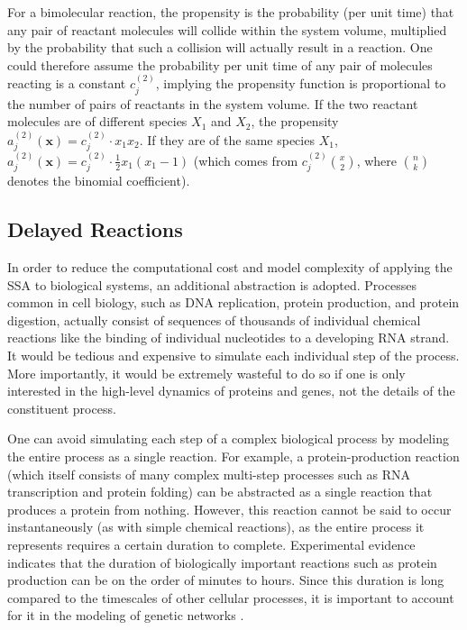 \documentclass[english,letterpaper,12pt]{report}
\renewcommand{\vec}[1]{\ensuremath{\mathbf{#1}}}
\begin{document}
\begin{doublespacing}
For a bimolecular reaction, the propensity is the probability (per unit time) that any pair of reactant molecules will collide within the system volume, multiplied by the probability that such a collision will actually result in a reaction. One could therefore assume the probability per unit time of any pair of molecules reacting is a constant $c_j^{(2)}$, implying the propensity function is proportional to the number of pairs of reactants in the system volume. If the two reactant molecules are of different species $X_1$ and $X_2$, the propensity $a_j^{(2)}(\vec{x}) = c_j^{(2)} \cdot x_1 x_2$. If they are of the same species $X_1$, $a_j^{(2)}(\vec{x}) = c_j^{(2)} \cdot \frac{1}{2}x_1(x_1 - 1)$ (which comes from $c_j^{(2)}\binom{x}{2}$, where $\binom{n}{k}$ denotes the binomial coefficient).


\subsection{Delayed Reactions} %
\label{sub:delayed-reactions}

In order to reduce the computational cost and model complexity of applying the SSA to biological systems, an additional abstraction is adopted. Processes common in cell biology, such as DNA replication, protein production, and protein digestion, actually consist of sequences of thousands of individual chemical reactions like the binding of individual nucleotides to a developing RNA strand. It would be tedious and expensive to simulate each individual step of the process. More importantly, it would be extremely wasteful to do so if one is only interested in the high-level dynamics of proteins and genes, not the details of the constituent process.

One can avoid simulating each step of a complex biological process by modeling the entire process as a single reaction. For example, a protein-production reaction (which itself consists of many complex multi-step processes such as RNA transcription and protein folding) can be abstracted as a single reaction that produces a protein from nothing. However, this reaction cannot be said to occur instantaneously (as with simple chemical reactions), as the entire process it represents requires a certain duration to complete. Experimental evidence indicates that the duration of biologically important reactions such as protein production can be on the order of minutes to hours. Since this duration is long compared to the timescales of other cellular processes, it is important to account for it in the modeling of genetic networks \cite{delay-oscillations}.


\end{doublespacing}
\end{document}
